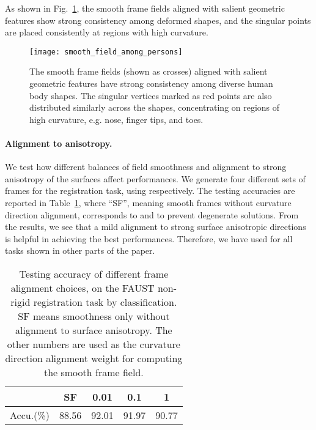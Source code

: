 \documentclass[10pt,twocolumn,letterpaper]{article}
\begin{document}
As shown in Fig.~\ref{fig:smooth_field_examples}, the smooth frame fields aligned with salient geometric features show strong consistency among deformed shapes, and the singular points are placed consistently at regions with high curvature.


\begin{figure}[t]
	\texttt{[image: smooth\_field\_among\_persons]}
	\vspace{-5mm}
	\caption{The smooth frame fields (shown as crosses) aligned with salient geometric features have strong consistency among diverse human body shapes. The singular vertices marked as red points are also distributed similarly across the shapes, concentrating on regions of high curvature, e.g. nose, finger tips, and toes.}
	\label{fig:smooth_field_examples}
	\vspace{-0mm}
\end{figure}


\paragraph{Alignment to anisotropy.}
We test how different balances of field smoothness and alignment to strong anisotropy of the surfaces affect performances.
We generate four different sets of frames for the registration task, using  respectively. 
The testing accuracies are reported in Table~\ref{tab:smooth_align}, where ``SF'', meaning smooth frames without curvature direction alignment, corresponds to  and  to prevent degenerate solutions.
From the results, we see that a mild alignment to strong surface anisotropic directions is helpful in achieving the best performances. Therefore, we have used  for all tasks shown in other parts of the paper.

\begin{table}
	\caption{Testing accuracy of different frame alignment choices, on the FAUST non-rigid registration task by classification. SF means smoothness only without alignment to surface anisotropy. The other numbers are used as the curvature direction alignment weight  for computing the smooth frame field.	}
	\label{tab:smooth_align}
	\vspace{1mm}
	\footnotesize
	\centering
	\begin{tabular}{|c|c|c|c|c|}
		\hline
		& SF  & 0.01 & 0.1 & 1  \\ \hline
		Accu.(\%) & 88.56 & 92.01 & 91.97 & 90.77  \\ \hline
	\end{tabular}
	\vspace{-2mm}
\end{table}
\end{document}
